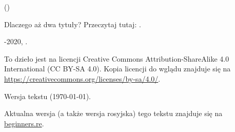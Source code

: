 ﻿\begin{titlepage}


\end{titlepage}

\newpage

\begin{center}
\vspace*{\fill}
{\LARGE \TitleMain}

\bigskip

{\large (\TitleAux)}

\bigskip
\bigskip
Dlaczego aż dwa tytuły? Przeczytaj tutaj: .

\vspace*{\fill}

{\large \AUTHOR}

{\large \TT{\EMAILPRI}}
\vspace*{\fill}
\vfill

\ccbysa

-2020, \AUTHOR. 

To dzieło jest na licencji Creative Commons Attribution-ShareAlike 4.0 International (CC BY-SA 4.0).
Kopia licencji do wglądu znajduje się na \url{https://creativecommons.org/licenses/by-sa/4.0/}.

Wersja tekstu ({\large \today}).

Aktualna wersja (a także wersja rosyjska) tego tekstu znajduje się na  \href{http://go.yurichev.com/17009}{beginners.re}.

\end{center}
